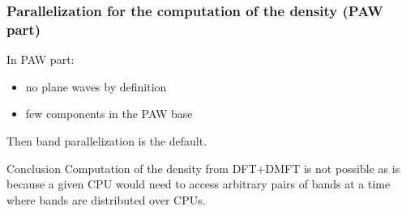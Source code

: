 \begin{frame}
  \frametitle{Parallelization for the computation of the density (PAW part)}
  In PAW part:
  \begin{itemize}
    \item no plane waves by definition
    \item few components in the PAW base
  \end{itemize}
  Then band parallelization is the default.
\end{frame}

\begin{frame}
  \begin{block}{Conclusion}
    Computation of the density from DFT+DMFT is not possible as is because a given
    CPU would need to access arbitrary pairs of bands at a time where bands are
    distributed over CPUs.
  \end{block}
\end{frame}
